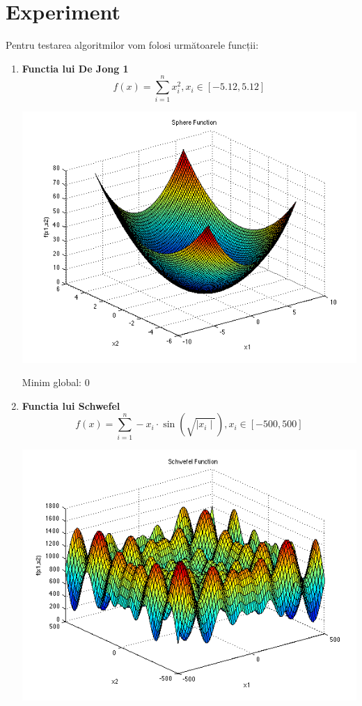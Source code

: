 \documentclass{article}
\begin{document}
\section{Experiment}
Pentru testarea algoritmilor vom folosi următoarele funcții:
\begin{enumerate}
\item \textbf{Functia lui De Jong 1}
$$ f(x) = \sum_{i=1}^n x_i^2, 
x_i \in \left[ -5.12, 5.12 \right]$$

\includegraphics[scale=0.4]{spheref.png}

Minim global: 0

\item \textbf{Functia lui Schwefel}
$$ f(x) = \sum_{i=1}^n -x_i \cdot \sin (\sqrt{\mid x_i\mid}),
x_i \in \left[ -500, 500\right]  $$

\includegraphics[scale=0.4]{schwef.png}


\end{enumerate}
\end{document}
